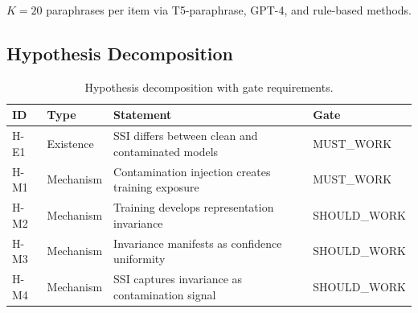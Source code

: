 $K=20$ paraphrases per item via T5-paraphrase, GPT-4, and rule-based methods.

\subsection{Hypothesis Decomposition}

\begin{table}[h]
\centering
\begin{tabular}{llll}
\toprule
ID & Type & Statement & Gate \\
\midrule
H-E1 & Existence & SSI differs between clean and contaminated models & MUST\_WORK \\
H-M1 & Mechanism & Contamination injection creates training exposure & MUST\_WORK \\
H-M2 & Mechanism & Training develops representation invariance & SHOULD\_WORK \\
H-M3 & Mechanism & Invariance manifests as confidence uniformity & SHOULD\_WORK \\
H-M4 & Mechanism & SSI captures invariance as contamination signal & SHOULD\_WORK \\
\bottomrule
\end{tabular}
\caption{Hypothesis decomposition with gate requirements.}
\label{tab:hypotheses}
\end{table}
